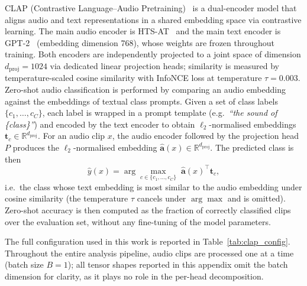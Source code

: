 CLAP (Contrastive Language--Audio Pretraining)~\cite{msclap} is a
dual-encoder model that aligns audio and text representations in a shared
embedding space via contrastive learning. The main audio encoder is
HTS-AT~\cite{htsat} and the main text encoder is
GPT-2~\cite{gpt} (embedding dimension 768), whose weights are
frozen throughout training. Both encoders are independently projected to a
joint space of dimension $d_{\mathrm{proj}} = 1024$ via dedicated linear
projection heads; similarity is measured by temperature-scaled cosine
similarity with InfoNCE loss at temperature $\tau = 0.003$.
Zero-shot audio classification is performed by comparing an audio embedding
against the embeddings of textual class prompts.
Given a set of class labels $\{c_1, \ldots, c_C\}$, each label is wrapped
in a prompt template (e.g.\ \textit{``the sound of \{class\}''}) and encoded
by the text encoder to obtain $\ell_2$-normalised embeddings
$\mathbf{t}_c \in \mathbb{R}^{d_{\mathrm{proj}}}$.
For an audio clip $x$, the audio encoder followed by the projection head $P$
produces the $\ell_2$-normalised embedding
$\hat{\mathbf{a}}(x) \in \mathbb{R}^{d_{\mathrm{proj}}}$.
The predicted class is then
\begin{equation}
    \hat{y}(x) = \arg\max_{c \in \{c_1,\ldots,c_C\}}\;
    \hat{\mathbf{a}}(x)^{\top} \mathbf{t}_c,
    \label{eq:zs_inference}
\end{equation}
i.e.\ the class whose text embedding is most similar to the audio embedding
under cosine similarity (the temperature $\tau$ cancels under $\arg\max$
and is omitted). Zero-shot accuracy is then computed as the fraction of
correctly classified clips over the evaluation set, without any fine-tuning
of the model parameters.

The full configuration used in this work is reported in
Table~\ref{tab:clap_config}. Throughout the entire analysis pipeline,
audio clips are processed one at a time (batch size $B = 1$); all
tensor shapes reported in this appendix omit the batch dimension for
clarity, as it plays no role in the per-head decomposition.

